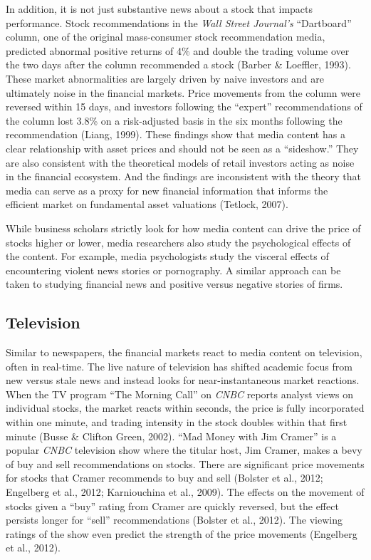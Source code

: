 \documentclass[12pt,]{article}
\begin{document}
In addition, it is not just substantive news about a stock that impacts
performance. Stock recommendations in the \emph{Wall Street Journal's}
``Dartboard'' column, one of the original mass-consumer stock
recommendation media, predicted abnormal positive returns of 4\% and
double the trading volume over the two days after the column recommended
a stock (Barber \& Loeffler, 1993). These market abnormalities are
largely driven by naive investors and are ultimately noise in the
financial markets. Price movements from the column were reversed within
15 days, and investors following the ``expert'' recommendations of the
column lost 3.8\% on a risk-adjusted basis in the six months following
the recommendation (Liang, 1999). These findings show that media content
has a clear relationship with asset prices and should not be seen as a
``sideshow.'' They are also consistent with the theoretical models of
retail investors acting as noise in the financial ecosystem. And the
findings are inconsistent with the theory that media can serve as a
proxy for new financial information that informs the efficient market on
fundamental asset valuations (Tetlock, 2007).

While business scholars strictly look for how media content can drive
the price of stocks higher or lower, media researchers also study the
psychological effects of the content. For example, media psychologists
study the visceral effects of encountering violent news stories or
pornography. A similar approach can be taken to studying financial news
and positive versus negative stories of firms.

\hypertarget{television}{%
\subsection{Television}\label{television}}

Similar to newspapers, the financial markets react to media content on
television, often in real-time. The live nature of television has
shifted academic focus from new versus stale news and instead looks for
near-instantaneous market reactions. When the TV program ``The Morning
Call'' on \emph{CNBC} reports analyst views on individual stocks, the
market reacts within seconds, the price is fully incorporated within one
minute, and trading intensity in the stock doubles within that first
minute (Busse \& Clifton Green, 2002). ``Mad Money with Jim Cramer'' is
a popular \emph{CNBC} television show where the titular host, Jim
Cramer, makes a bevy of buy and sell recommendations on stocks. There
are significant price movements for stocks that Cramer recommends to buy
and sell (Bolster et al., 2012; Engelberg et al., 2012; Karniouchina et
al., 2009). The effects on the movement of stocks given a ``buy'' rating
from Cramer are quickly reversed, but the effect persists longer for
``sell'' recommendations (Bolster et al., 2012). The viewing ratings of
the show even predict the strength of the price movements (Engelberg et
al., 2012).
\end{document}
